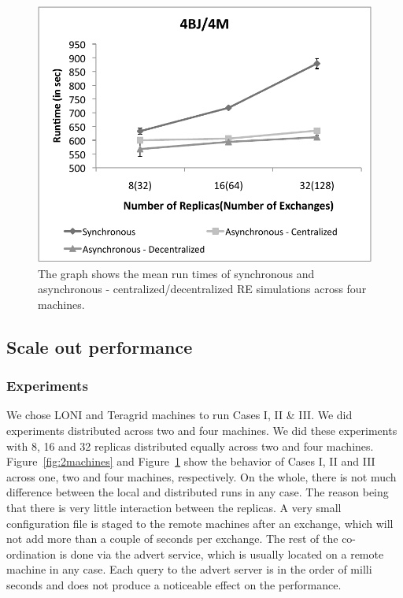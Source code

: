 \documentclass[a4paper,10pt]{article}
\begin{document}
\begin{figure}
\centering
\includegraphics[scale=0.80]{data/4Machines.pdf}
\caption{\small The graph shows the mean run times of synchronous and asynchronous - centralized/decentralized RE simulations across four machines.}
\label{fig:4machines}
\vspace{-1em}
\end{figure}

\subsection{Scale out performance}
\subsubsection{Experiments}
We chose LONI and Teragrid machines to run Cases I, II \& III. We did experiments distributed across two and four machines. We did these experiments with 8, 16 and 32 replicas distributed equally across two and four machines. 
Figure~\ref{fig:2machines} and Figure~\ref{fig:4machines} show the behavior of Cases I, II and III across one, two and four machines, respectively. On the whole, there is not much difference between the local and distributed runs in any case. The reason being that there is very little interaction between the replicas. A very small configuration file is staged to the remote machines after an exchange, which will not add more than a couple of seconds per exchange. The rest of the co-ordination is done via the advert service, which is usually located on a remote machine in any case. Each query to the advert server is in the order of milli seconds and does not produce a noticeable effect on the performance. 
\end{document}
